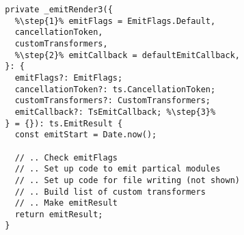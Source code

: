\begin{verbatim}
  private _emitRender3({
    %\step{1}% emitFlags = EmitFlags.Default,
    cancellationToken,
    customTransformers,
    %\step{2}% emitCallback = defaultEmitCallback,
  }: {
    emitFlags?: EmitFlags;
    cancellationToken?: ts.CancellationToken;
    customTransformers?: CustomTransformers;
    emitCallback?: TsEmitCallback; %\step{3}%
  } = {}): ts.EmitResult {
    const emitStart = Date.now();

    // .. Check emitFlags
    // .. Set up code to emit partical modules
    // .. Set up code for file writing (not shown)
    // .. Build list of custom transformers
    // .. Make emitResult
    return emitResult;
  }
\end{verbatim}
